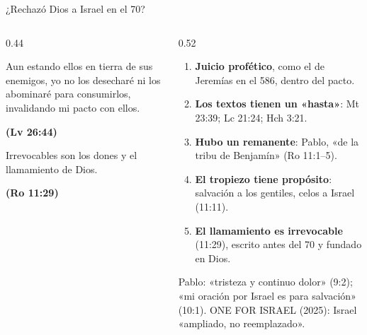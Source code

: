 \documentclass[hyperref={bookmarks=false},aspectratio=169]{beamer}
\newcommand{\fuente}[1]{\par\hfill{\upshape\bfseries\footnotesize\textcolor{ladrillo}{#1}}}
\begin{document}
\begin{frame}{¿Rechazó Dios a Israel en el 70?}
\begin{columns}[T,onlytextwidth]
\begin{column}{0.44\textwidth}
\begin{cita}Aun estando ellos en tierra de sus enemigos, yo no los desecharé ni los abominaré para consumirlos, invalidando mi pacto con ellos.\fuente{(Lv 26:44)}\end{cita}
\begin{cita}Irrevocables son los dones y el llamamiento de Dios.\fuente{(Ro 11:29)}\end{cita}
\end{column}
\begin{column}{0.52\textwidth}\footnotesize
\begin{enumerate}
\item \textbf{Juicio profético}, como el de Jeremías en el 586, dentro del pacto.
\item \textbf{Los textos tienen un «hasta»}: Mt 23:39; Lc 21:24; Hch 3:21.
\item \textbf{Hubo un remanente}: Pablo, «de la tribu de Benjamín» (Ro 11:1--5).
\item \textbf{El tropiezo tiene propósito}: salvación a los gentiles, celos a Israel (11:11).
\item \textbf{El llamamiento es irrevocable} (11:29), escrito antes del 70 y fundado en Dios.
\end{enumerate}
\begin{clave}Pablo: «tristeza y continuo dolor» (9:2); «mi oración por Israel es para salvación» (10:1). ONE FOR ISRAEL (2025): Israel «ampliado, no reemplazado».\end{clave}
\end{column}
\end{columns}
\end{frame}

\end{document}
